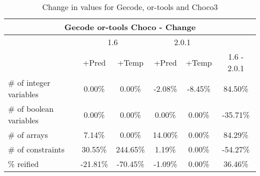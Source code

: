 \documentclass{standalone}
\begin{document}
\begin{table}[H]
\footnotesize
\centering
\begin{tabular}{lc|c|c|c|c}
\multicolumn{6}{c}{Gecode or-tools Choco - Change} \\ 
\hline\hline  & \multicolumn{2}{c|}{1.6} &\multicolumn{2}{c|}{2.0.1} &\\ 
\hline  & +Pred & +Temp & +Pred & +Temp & 1.6 - 2.0.1\\
\# of integer variables & 0.00\% & 0.00\% & -2.08\% & -8.45\% & 84.50\% \\ 
\# of boolean variables & 0.00\% & 0.00\% & 0.00\% & 0.00\% & -35.71\% \\ 
\# of arrays            & 7.14\% & 0.00\% & 14.00\% & 0.00\% & 84.29\% \\
\# of constraints       & 30.55\% & 244.65\% & 1.19\% & 0.00\% & -54.27\% \\ 
\% reified               & -21.81\% & -70.45\% & -1.09\% & 0.00\% & 36.46\%\\ 
\end{tabular}\caption{Change in values for Gecode, or-tools and Choco3}
\end{table}
\end{document}
